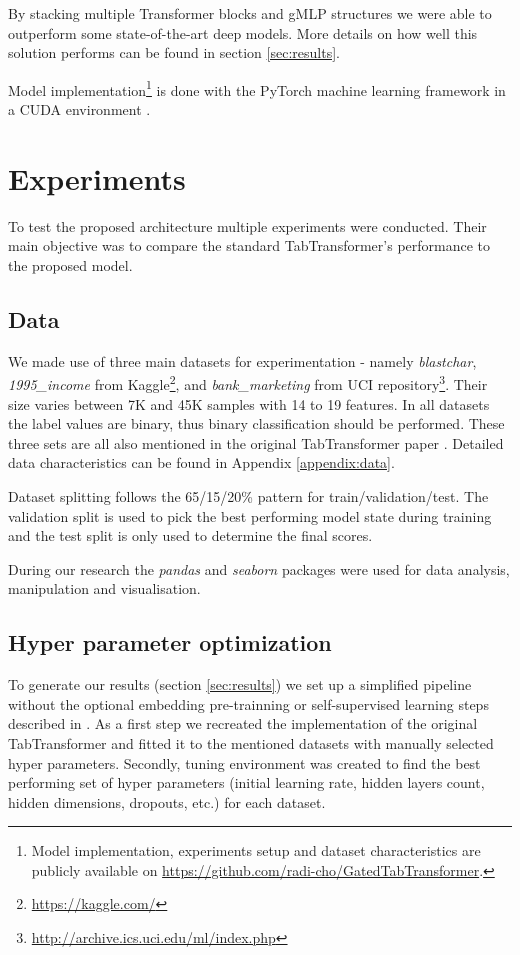 \documentclass{article}
\newcommand{\projectSource}{\url{https://github.com/radi-cho/GatedTabTransformer}}
\begin{document}
By stacking multiple Transformer blocks and gMLP structures we were able to outperform some state-of-the-art deep models. More details on how well this solution performs can be found in section \ref{sec:results}.

Model implementation\footnote{Model implementation, experiments setup and dataset characteristics are publicly available on \projectSource.} is done with the PyTorch \cite{NEURIPS2019_9015} machine learning framework in a CUDA environment \cite{cuda}.

\section{Experiments}

To test the proposed architecture multiple experiments were conducted. Their main objective was to compare the standard TabTransformer's performance to the proposed model.

\subsection{Data}

We made use of three main datasets for experimentation - namely \textit{blastchar}, \textit{1995\_income} from Kaggle\footnote{\url{https://kaggle.com/}}, and \textit{bank\_marketing} from UCI repository\footnote{\url{http://archive.ics.uci.edu/ml/index.php}}. Their size varies between 7K and 45K samples with 14 to 19 features. In all datasets the label values are binary, thus binary classification should be performed. These three sets are all also mentioned in the original TabTransformer paper \cite{Huang2020TabTransformerTD}. Detailed data characteristics can be found in Appendix \ref{appendix:data}.

Dataset splitting follows the 65/15/20\% pattern for train/validation/test. The validation split is used to pick the best performing model state during training and the test split is only used to determine the final scores.

During our research the \textit{pandas} \cite{mckinney-proc-scipy-2010} and \textit{seaborn} \cite{Waskom2021} packages were used for data analysis, manipulation and visualisation.

\subsection{Hyper parameter optimization}

To generate our results (section \ref{sec:results}) we set up a simplified pipeline without the optional embedding pre-trainning or self-supervised learning steps described in \cite{Huang2020TabTransformerTD}. As a first step we recreated the implementation of the original TabTransformer and fitted it to the mentioned datasets with manually selected hyper parameters. Secondly, tuning environment was created to find the best performing set of hyper parameters (initial learning rate, hidden layers count, hidden dimensions, dropouts, etc.) for each dataset.
\end{document}
